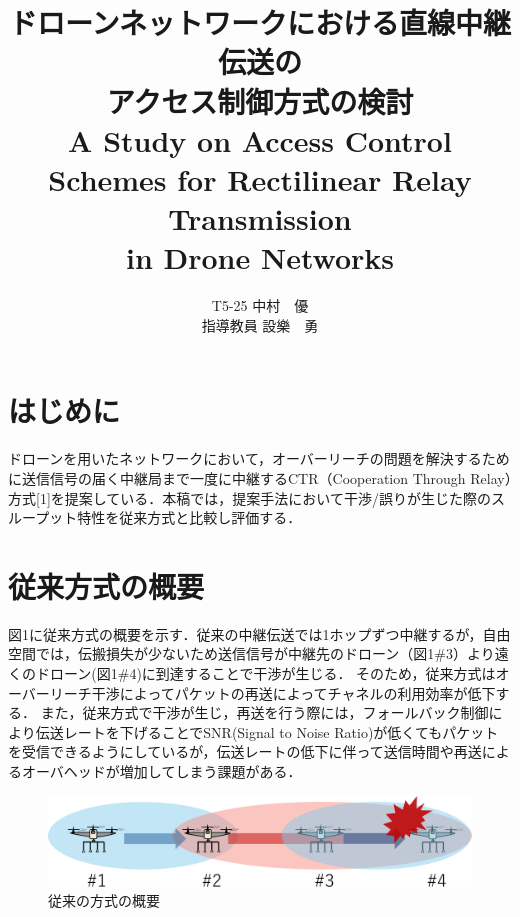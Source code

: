 \documentclass[a4paper,10pt]{ltjsarticle}
\title{\huge ドローンネットワークにおける直線中継伝送の\\アクセス制御方式の検討\\
\Large A Study on Access Control Schemes for Rectilinear Relay Transmission \\in Drone Networks
}
\author{
T5-25 \:中村　優\\
指導教員 \: 設樂　勇
}
\date{}
\begin{document}
\twocolumn[
\maketitle
]

\section{はじめに}
ドローンを用いたネットワークにおいて，オーバーリーチの問題を解決するために送信信号の届く中継局まで一度に中継するCTR（Cooperation Through Relay）方式[1]を提案している．本稿では，提案手法において干渉/誤りが生じた際のスループット特性を従来方式と比較し評価する．

\section{従来方式の概要}
図1に従来方式の概要を示す．従来の中継伝送では1ホップずつ中継するが，自由空間では，伝搬損失が少ないため送信信号が中継先のドローン（図1\#3）より遠くのドローン(図1\#4)に到達することで干渉が生じる．
そのため，従来方式はオーバーリーチ干渉によってパケットの再送によってチャネルの利用効率が低下する．
また，従来方式で干渉が生じ，再送を行う際には，フォールバック制御により伝送レートを下げることでSNR(Signal to Noise Ratio)が低くてもパケットを受信できるようにしているが，伝送レートの低下に伴って送信時間や再送によるオーバヘッドが増加してしまう課題がある．

\begin{figure}[H]
  \centering
  \includegraphics[width=\linewidth]{cenventional_topology.pdf} %
  \caption{従来の方式の概要}

\end{figure}
\end{document}
